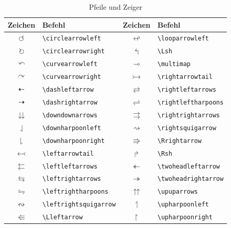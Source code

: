 \documentclass[a4paper,10pt,twoside]{scrbook}
\begin{document}
{\begin{table}[h!tb]
\centering
\caption{Pfeile und Zeiger}
\label{Tabelle_Pfeile2}       %
\begin{tabular}{clcl}
\hline
Zeichen & Befehl & Zeichen & Befehl  \\
\hline
$\circlearrowleft$ & \texttt{\textbackslash circlearrowleft} & 
$\looparrowleft$ & \texttt{\textbackslash looparrowleft} \\
$\circlearrowright$ & \texttt{\textbackslash circlearrowright} &
$\Lsh$ & \texttt{\textbackslash Lsh} \\
$\curvearrowleft$ & \texttt{\textbackslash curvearrowleft} &
$\multimap$ & \texttt{\textbackslash multimap} \\
$\curvearrowright$ & \texttt{\textbackslash curvearrowright} &
$\rightarrowtail$ & \texttt{\textbackslash rightarrowtail} \\
$\dashleftarrow$ & \texttt{\textbackslash dashleftarrow} &
$\rightleftarrows$ & \texttt{\textbackslash rightleftarrows} \\
$\dashrightarrow$ & \texttt{\textbackslash dashrightarrow} &
$\rightleftharpoons$ & \texttt{\textbackslash rightleftharpoons} \\
$\downdownarrows$ & \texttt{\textbackslash downdownarrows} &
$\rightrightarrows$ & \texttt{\textbackslash rightrightarrows} \\
$\downharpoonleft$ & \texttt{\textbackslash downharpoonleft} &
$\rightsquigarrow$ & \texttt{\textbackslash rightsquigarrow} \\
$\downharpoonright$ & \texttt{\textbackslash downharpoonright} &
$\Rrightarrow$ & \texttt{\textbackslash Rrightarrow} \\
$\leftarrowtail$ & \texttt{\textbackslash leftarrowtail} &
$\Rsh$ & \texttt{\textbackslash Rsh} \\
$\leftleftarrows$ & \texttt{\textbackslash leftleftarrows} &
$\twoheadleftarrow$ & \texttt{\textbackslash twoheadleftarrow} \\
$\leftrightarrows$ & \texttt{\textbackslash leftrightarrows} &
$\twoheadrightarrow$ & \texttt{\textbackslash twoheadrightarrow} \\
$\leftrightharpoons$ & \texttt{\textbackslash leftrightharpoons} &
$\upuparrows$ & \texttt{\textbackslash upuparrows} \\
$\leftrightsquigarrow$ & \texttt{\textbackslash leftrightsquigarrow} &
$\upharpoonleft$ & \texttt{\textbackslash upharpoonleft} \\
$\Lleftarrow$ & \texttt{\textbackslash Lleftarrow} &
$\upharpoonright$ & \texttt{\textbackslash upharpoonright} \\
\hline
\end{tabular}
\end{table}

}
\end{document}
